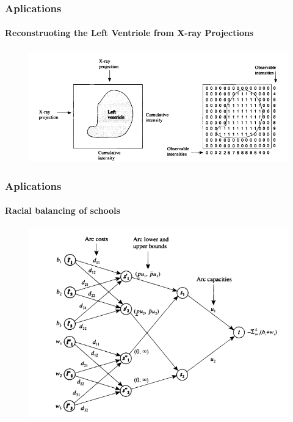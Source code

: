 \documentclass{beamer}
\begin{document}
\begin{frame}
  \frametitle{Aplications}
  \framesubtitle{Reconstruoting the Left Ventriole from
  X-ray Projections}
  \begin{figure}[h!t]
  \centering
  \includegraphics[scale = 0.4 ]{x-rayproblem.png}
  \end{figure}
  \end{frame}

\begin{frame}
  \frametitle{Aplications}
  \framesubtitle{Racial balancing of schools}
  \begin{figure}[h!t]
  \centering
  \includegraphics[scale = 0.4 ]{scholarproblem.png}
  \end{figure}
\end{frame}
\end{document}
